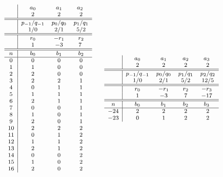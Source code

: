 \documentclass[a4paper,12pt]{amsart}
\newcommand{\0}{\mathtt{0}}
\newcommand{\1}{\mathtt{1}}
\newcommand{\2}{\mathtt{2}}
\newcommand{\3}{\mathtt{3}}
\begin{document}
\begin{table}
\[
\footnotesize
\begin{array}{c|cccc}
       &  a_0  & a_1   & a_2 \\
       &  2  &  2    & 2   \\
\hline
\hline
       &  p_{-1}/q_{-1}  & p_0/q_0  & p_1/q_1  \\
       &  1/0  &  2/1    & 5/2  \\
\hline
\hline
       &  r_0  & -r_1   & r_2 \\
       &  1  &  -3   & 7   \\
\hline
\hline
  n    &  b_0  & b_1   & b_2 \\
\hline
  0   & 0  & 0  &  0\\
  1   & 1  & 0  &  0\\
  2   & 2  & 0  &  0\\
  3   & 2  & 2  &  1\\
  4   & 0  & 1  &  1\\
  5   & 1  & 1  &  1\\
  6   & 2  & 1  &  1\\
  7   & 0  & 0  &  1\\
  8   & 1  & 0  &  1\\
  9   & 2  & 0  &  1\\
  10  & 2  & 2  &  2\\
  11  & 0  & 1  &  2\\
  12  & 1  & 1  &  2\\
  13  & 2  & 1  &  2\\
  14  & 0  & 0  &  2\\
  15  & 1  & 0  &  2\\
  16  & 2  & 0  &  2\\
\end{array}
\qquad
\begin{array}{c|cccc}
       &  a_0  & a_1   & a_2 & a_3 \\
       &  2  &  2    & 2   & 2 \\
\hline
\hline
       &  p_{-1}/q_{-1}  & p_0/q_0  & p_1/q_1   & p_2/q_2 \\
       &  1/0  &  2/1    & 5/2   & 12/5 \\
\hline
\hline
       &  r_0  & -r_1   & r_2 & -r_3 \\
       &  1  &  -3   & 7   & -17 \\
\hline
\hline
  n    &  b_0  & b_1   & b_2 & b_3 \\
\hline
  -24  &  2  &  2    & 2   & 2 \\
  -23  &  0  &  1    & 2   & 2 \\

\end{array}\]
\end{table}
\end{document}
